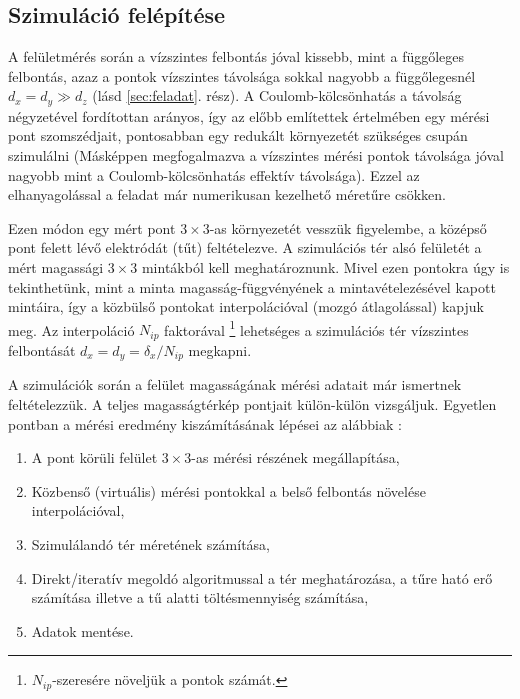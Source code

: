 
	

\subsection{Szimuláció felépítése} \label{sec:felepites}
	
	A felületmérés során a vízszintes felbontás jóval kissebb, mint a függőleges felbontás, azaz a
	pontok vízszintes távolsága sokkal nagyobb a függőlegesnél $d_x=d_y \gg d_z$ (lásd \ref{sec:feladat}. rész).
	A Coulomb-kölcsönhatás a távolság négyzetével fordítottan arányos, így az előbb említettek értelmében egy mérési pont szomszédjait, pontosabban egy redukált
	környezetét szükséges csupán szimulálni (Másképpen megfogalmazva a vízszintes mérési pontok
	távolsága jóval nagyobb mint a Coulomb-kölcsönhatás effektív távolsága). Ezzel az elhanyagolással
	a feladat már numerikusan kezelhető méretűre csökken.
	
	Ezen módon egy mért pont $3\times3$-as környezetét vesszük figyelembe,
	a középső pont felett lévő elektródát (tűt) feltételezve.
	A szimulációs tér alsó felületét a mért magassági $3\times 3$ mintákból kell meghatároznunk.
	Mivel ezen pontokra úgy is tekinthetünk, mint a minta magasság-függvényének a mintavételezésével
	kapott mintáira, így a közbülső pontokat interpolációval (mozgó átlagolással) kapjuk meg.
	Az interpoláció $N_{ip}$ faktorával \footnote{$N_{ip}$-szeresére növeljük a pontok számát.}
	lehetséges a szimulációs tér vízszintes felbontását $d_x=d_y = \delta_x / N_{ip}$ megkapni.

	A szimulációk során a felület magasságának mérési adatait már ismertnek feltételezzük.
	A teljes magasságtérkép pontjait külön-külön vizsgáljuk.
	Egyetlen pontban a mérési eredmény kiszámításának lépései az alábbiak :
	
	\begin{enumerate}
		\item A pont körüli felület $3\times3$-as mérési részének megállapítása,
		\item Közbenső (virtuális) mérési pontokkal a belső felbontás növelése
		interpolációval,
		\item Szimulálandó tér méretének számítása,
		\item Direkt/iteratív megoldó algoritmussal a tér meghatározása, 
				a tűre ható erő számítása illetve a tű alatti töltésmennyiség számítása,
		\item Adatok mentése.
	\end{enumerate}
	

	
